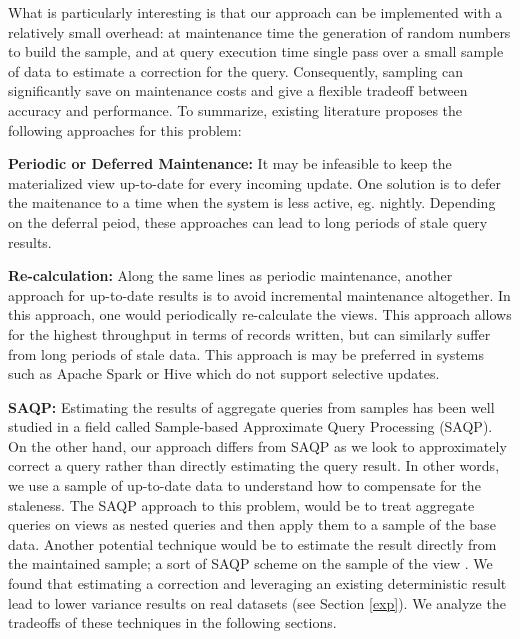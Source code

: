 What is particularly interesting is that our approach can be implemented with a relatively small overhead: at maintenance time the generation of random numbers to build the sample, and at query execution time single pass over a small sample of data to estimate a correction for the query.
Consequently, sampling can significantly save on maintenance costs and give a flexible tradeoff between accuracy and performance.
To summarize, existing literature proposes the following approaches for this problem: 
\vspace{1em}

\noindent\textbf{Periodic or Deferred Maintenance: }
It may be infeasible to keep the materialized view up-to-date for every incoming update.
One solution is to defer the maitenance to a time when the system is less active, eg. nightly.
Depending on the deferral peiod, these approaches can lead to long periods of stale query results.

\vspace{1em}

\noindent\textbf{Re-calculation: }
Along the same lines as periodic maintenance, another approach 
for up-to-date results is to avoid incremental maintenance altogether.
In this approach, one would periodically re-calculate the views.
This approach allows for the highest throughput in terms of records written, but can
similarly suffer from long periods of stale data.
This approach is may be preferred in systems such as Apache Spark or Hive which do not support
selective updates. 

\vspace{1em}

\noindent\textbf{SAQP: }
Estimating the results of aggregate queries from samples has been
well studied in a field called Sample-based Approximate Query Processing
(SAQP). On the other hand, our approach differs from SAQP as we look to
approximately correct a query rather than directly estimating the query result.
In other words, we use a sample of up-to-date data to understand how to compensate for the
staleness. The SAQP approach to this problem, would be to treat aggregate
queries on views as nested queries and then apply them to a sample
of the base data. Another potential technique would be to
estimate the result directly from the maintained sample; a sort of
SAQP scheme on the sample of the view \cite{joshi2008materialized}. We found that estimating
a correction and leveraging an existing deterministic result lead
to lower variance results on real datasets (see Section \ref{exp}). We analyze
the tradeoffs of these techniques in the following sections.

